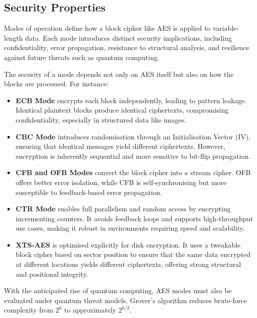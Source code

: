 \subsection{Security Properties}

Modes of operation define how a block cipher like AES is applied to variable-length data. 
Each mode introduces distinct security implications, 
including confidentiality, error propagation, resistance to structural analysis, 
and resilience against future threats such as quantum computing.

\noindent The security of a mode depends not only on AES itself but also on how the blocks are processed. 
For instance:

\begin{itemize}
    \item \textbf{ECB Mode} encrypts each block independently, leading to pattern leakage. Identical plaintext blocks produce identical ciphertexts, compromising confidentiality, especially in structured data like images.
    
    \item \textbf{CBC Mode} introduces randomisation through an Initialisation Vector (IV), ensuring that identical messages yield different ciphertexts. However, encryption is inherently sequential and more sensitive to bit-flip propagation.
    
    \item \textbf{CFB and OFB Modes} convert the block cipher into a stream cipher. OFB offers better error isolation, while CFB is self-synchronising but more susceptible to feedback-based error propagation.
    
    \item \textbf{CTR Mode} enables full parallelism and random access by encrypting incrementing counters. It avoids feedback loops and supports high-throughput use cases, making it robust in environments requiring speed and scalability.
    
    \item \textbf{XTS-AES} is optimised explicitly for disk encryption. It uses a tweakable block cipher based on sector position to ensure that the same data encrypted at different locations yields different ciphertexts, offering strong structural and positional integrity.
\end{itemize}

\noindent With the anticipated rise of quantum computing, 
AES modes must also be evaluated under quantum threat models. 
Grover’s algorithm reduces brute-force complexity from $2^k$ to approximately $2^{k/2}$. \newline

